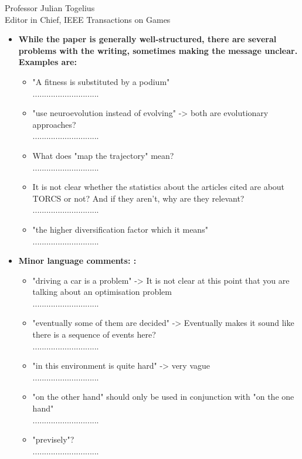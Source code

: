 \documentclass[10pt]{letter} %
\begin{document}
\begin{letter}{Professor Julian Togelius \\ Editor in Chief, IEEE Transactions on Games}
\begin{enumerate}
\begin{itemize}
		\item {\bf 	While the paper is generally well-structured, there are several problems with the writing, sometimes making the message unclear. Examples are:}
			\begin{itemize}
			\item "A fitness is substituted by a podium"\\
.............................
			\item "use neuroevolution instead of evolving" -> both are evolutionary approaches?\\
.............................
			\item What does "map the trajectory" mean?\\
.............................
			\item It is not clear whether the statistics about the articles cited are about TORCS or not? And if they aren't, why are they relevant?\\
.............................
			\item "the higher diversification factor which it means"\\
.............................
			\end{itemize}
	

	\item {\bf Minor language comments: :} 
				\begin{itemize}
				\item 	"driving a car is a problem" -> It is not clear at this point that you are talking about an optimisation problem\\
.............................
				\item 	"eventually some of them are decided" -> Eventually makes it sound like there is a sequence of events here?\\
.............................
	

				\item 	"in this environment is quite hard" -> very vague\\
.............................

				\item 	"on the other hand" should only be used in conjunction with "on the one hand"\\
.............................
				\item 	"previsely"?\\
.............................
			
			\end{itemize}
	
\end{itemize}
\end{enumerate}
 






\end{letter}
 
\end{document}
